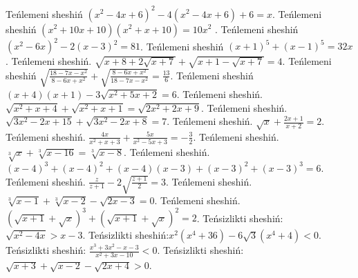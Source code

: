 Teńlemeni sheshiń \(\left( x^{2} - 4x + 6 \right)^{2} - 4\left( x^{2} - 4x + 6 \right) + 6 = x\).
Teńlemeni sheshiń \(\left( x^{2} + 10x + 10 \right)\left( x^{2} + x + 10 \right) = 10x^{2}\) .
Teńlemeni sheshiń \(\left( x^{2} - 6x \right)^{2} - 2(x - 3)^{2} = 81\).
Teńlemeni sheshiń \((x + 1)^{5} + (x - 1)^{5} = 32x\).
Teńlemeni sheshiń. \(\sqrt{x + 8 + 2\sqrt{x + 7}} + \sqrt{x + 1 - \sqrt{x + 7}} = 4\).
Teńlemeni sheshiń \(\sqrt{\frac{18 - 7x - x^{2}}{8 - 6x + x^{2}}} + \sqrt{\frac{8 - 6x + x^{2}}{18 - 7x - x^{2}}} = \frac{13}{6}\).
Teńlemeni sheshiń \((x + 4)(x + 1) - 3\sqrt{x^{2} + 5x + 2} = 6\).
Teńlemeni sheshiń. \(\sqrt{x^{2} + x + 4} + \sqrt{x^{2} + x + 1} = \sqrt{2x^{2} + 2x + 9}\).
Teńlemeni sheshiń. \(\sqrt{3x^{2} - 2x + 15} + \sqrt{3x^{2} - 2x + 8} = 7\).
Teńlemeni sheshiń. \(\sqrt{x} + \frac{2x + 1}{x + 2} = 2\).
Teńlemeni sheshiń. \(\frac{4x}{x^{2} + x + 3} + \frac{5x}{x^{2} - 5x + 3} = - \frac{3}{2}\).
Teńlemeni sheshiń. \(\sqrt[3]{x} + \sqrt[3]{x - 16} = \sqrt[3]{x - 8}\).
Teńlemeni sheshiń. \((x - 4)^{3} + (x - 4)^{2} + (x - 4)(x - 3) + (x - 3)^{2} + (x - 3)^{3} = 6\).
Teńlemeni sheshiń. \(\frac{z}{z + 1} - 2\sqrt{\frac{z + 1}{2}} = 3\).
Teńlemeni sheshiń. \(\sqrt[3]{x - 1} + \sqrt[3]{x - 2} - \sqrt{2x - 3} = 0\).
Teńlemeni sheshiń. \((\sqrt{x + 1} + \sqrt{x})^{3} + (\sqrt{x + 1} + \sqrt{x})^{2} = 2\).
Teńsizlikti sheshiń: \(\sqrt{x^{2} - 4x} > x - 3\).
Teńsizlikti sheshiń:\(x^{2}\left( x^{4} + 36 \right) - 6\sqrt{3}\left( x^{4} + 4 \right) < 0\).
Teńsizlikti sheshiń: \(\frac{x^{3} + 3x^{2} - x - 3}{x^{2} + 3x - 10} < 0\).
Teńsizlikti sheshiń: \(\sqrt{x + 3} + \sqrt{x - 2} - \sqrt{2x + 4} > 0\).